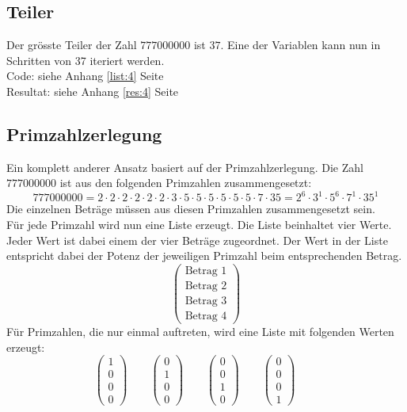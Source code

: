 \documentclass[a4paper, 10pt, fleqn]{article}
\begin{document}
\subsection{Teiler}
\label{sec:4}
Der grösste Teiler der Zahl $777000000$ ist $37$. Eine der Variablen kann nun 
in Schritten von 37 iteriert werden. \\
Code: siehe Anhang \ref{list:4} Seite \pageref{list:4} \\
Resultat: siehe Anhang \ref{res:4} Seite \pageref{res:4} 
% 

\subsection{Primzahlzerlegung}
\label{sec:5}
Ein komplett anderer Ansatz basiert auf der Primzahlzerlegung. Die Zahl 
$777000000$ ist aus den folgenden Primzahlen zusammengesetzt: 
\[ 777000000 = 2 \cdot 2 \cdot 2 \cdot 2 \cdot 2 \cdot 2 \cdot 3 
\cdot 5 \cdot 5 \cdot 5 \cdot 5 \cdot 5 \cdot 5 \cdot 7 \cdot 35 
= 2^6 \cdot 3^1 \cdot 5^6 \cdot 7^1 \cdot 35^1 \]
Die einzelnen Beträge müssen aus diesen Primzahlen zusammengesetzt sein. \\
Für jede Primzahl wird nun eine Liste erzeugt. Die Liste beinhaltet vier Werte. 
Jeder Wert ist dabei einem der vier Beträge zugeordnet. Der Wert in der Liste 
entspricht dabei der Potenz der jeweiligen Primzahl beim entsprechenden Betrag. 
\[ \begin{pmatrix}\text{Betrag 1}\\\text{Betrag 2}
\\\text{Betrag 3}\\\text{Betrag 4}\end{pmatrix} \]
Für Primzahlen, die nur einmal auftreten, wird eine Liste mit folgenden Werten 
erzeugt: 
\[ \begin{pmatrix}1\\0\\0\\0\end{pmatrix} \qquad 
   \begin{pmatrix}0\\1\\0\\0\end{pmatrix} \qquad 
   \begin{pmatrix}0\\0\\1\\0\end{pmatrix} \qquad 
   \begin{pmatrix}0\\0\\0\\1\end{pmatrix} \qquad \]
\end{document}
